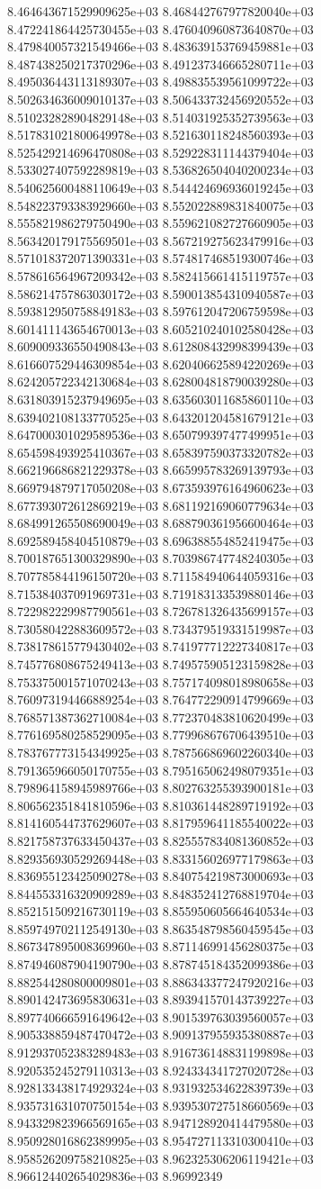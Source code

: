 	8.464643671529909625e+03	8.468442767977820040e+03	8.472241864425730455e+03	8.476040960873640870e+03	8.479840057321549466e+03	8.483639153769459881e+03	8.487438250217370296e+03	8.491237346665280711e+03	8.495036443113189307e+03	8.498835539561099722e+03	8.502634636009010137e+03	8.506433732456920552e+03	8.510232828904829148e+03	8.514031925352739563e+03	8.517831021800649978e+03	8.521630118248560393e+03	8.525429214696470808e+03	8.529228311144379404e+03	8.533027407592289819e+03	8.536826504040200234e+03	8.540625600488110649e+03	8.544424696936019245e+03	8.548223793383929660e+03	8.552022889831840075e+03	8.555821986279750490e+03	8.559621082727660905e+03	8.563420179175569501e+03	8.567219275623479916e+03	8.571018372071390331e+03	8.574817468519300746e+03	8.578616564967209342e+03	8.582415661415119757e+03	8.586214757863030172e+03	8.590013854310940587e+03	8.593812950758849183e+03	8.597612047206759598e+03	8.601411143654670013e+03	8.605210240102580428e+03	8.609009336550490843e+03	8.612808432998399439e+03	8.616607529446309854e+03	8.620406625894220269e+03	8.624205722342130684e+03	8.628004818790039280e+03	8.631803915237949695e+03	8.635603011685860110e+03	8.639402108133770525e+03	8.643201204581679121e+03	8.647000301029589536e+03	8.650799397477499951e+03	8.654598493925410367e+03	8.658397590373320782e+03	8.662196686821229378e+03	8.665995783269139793e+03	8.669794879717050208e+03	8.673593976164960623e+03	8.677393072612869219e+03	8.681192169060779634e+03	8.684991265508690049e+03	8.688790361956600464e+03	8.692589458404510879e+03	8.696388554852419475e+03	8.700187651300329890e+03	8.703986747748240305e+03	8.707785844196150720e+03	8.711584940644059316e+03	8.715384037091969731e+03	8.719183133539880146e+03	8.722982229987790561e+03	8.726781326435699157e+03	8.730580422883609572e+03	8.734379519331519987e+03	8.738178615779430402e+03	8.741977712227340817e+03	8.745776808675249413e+03	8.749575905123159828e+03	8.753375001571070243e+03	8.757174098018980658e+03	8.760973194466889254e+03	8.764772290914799669e+03	8.768571387362710084e+03	8.772370483810620499e+03	8.776169580258529095e+03	8.779968676706439510e+03	8.783767773154349925e+03	8.787566869602260340e+03	8.791365966050170755e+03	8.795165062498079351e+03	8.798964158945989766e+03	8.802763255393900181e+03	8.806562351841810596e+03	8.810361448289719192e+03	8.814160544737629607e+03	8.817959641185540022e+03	8.821758737633450437e+03	8.825557834081360852e+03	8.829356930529269448e+03	8.833156026977179863e+03	8.836955123425090278e+03	8.840754219873000693e+03	8.844553316320909289e+03	8.848352412768819704e+03	8.852151509216730119e+03	8.855950605664640534e+03	8.859749702112549130e+03	8.863548798560459545e+03	8.867347895008369960e+03	8.871146991456280375e+03	8.874946087904190790e+03	8.878745184352099386e+03	8.882544280800009801e+03	8.886343377247920216e+03	8.890142473695830631e+03	8.893941570143739227e+03	8.897740666591649642e+03	8.901539763039560057e+03	8.905338859487470472e+03	8.909137955935380887e+03	8.912937052383289483e+03	8.916736148831199898e+03	8.920535245279110313e+03	8.924334341727020728e+03	8.928133438174929324e+03	8.931932534622839739e+03	8.935731631070750154e+03	8.939530727518660569e+03	8.943329823966569165e+03	8.947128920414479580e+03	8.950928016862389995e+03	8.954727113310300410e+03	8.958526209758210825e+03	8.962325306206119421e+03	8.966124402654029836e+03	8.96992349